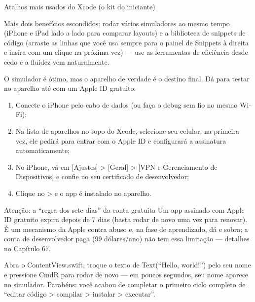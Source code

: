 \begin{center}\small\color{gray}Atalhos mais usados do Xcode (o kit do iniciante)\end{center}

Mais dois benefícios escondidos: rodar vários simuladores ao mesmo tempo (iPhone e iPad lado a lado para comparar layouts) e a biblioteca de snippets de código (arraste as linhas que você usa sempre para o painel de Snippets à direita e insira com um clique na próxima vez) — use as ferramentas de eficiência desde cedo e a fluidez vem naturalmente.


O simulador é ótimo, mas o aparelho de verdade é o destino final. Dá para testar no aparelho até com um Apple ID gratuito:

\begin{enumerate}
  \item Conecte o iPhone pelo cabo de dados (ou faça o debug sem fio no mesmo Wi-Fi);
  \item Na lista de aparelhos no topo do Xcode, selecione seu celular; na primeira vez, ele pedirá para entrar com o Apple ID e configurará a assinatura automaticamente;
  \item No iPhone, vá em [Ajustes] > [Geral] > [VPN e Gerenciamento de Dispositivos] e confie no seu certificado de desenvolvedor;
  \item Clique no > e o app é instalado no aparelho.
\end{enumerate}

\begin{tcbwarn}{Atenção: a “regra dos sete dias” da conta gratuita}
Um app assinado com Apple ID gratuito expira depois de 7 dias (basta rodar de novo uma vez para renovar). É um mecanismo da Apple contra abuso e, na fase de aprendizado, dá e sobra; a conta de desenvolvedor paga (99 dólares/ano) não tem essa limitação — detalhes no Capítulo 67.

\end{tcbwarn}



Abra o ContentView.swift, troque o texto de Text(“Hello, world!”) pelo seu nome e pressione CmdR para rodar de novo — em poucos segundos, seu nome aparece no simulador. Parabéns: você acabou de completar o primeiro ciclo completo de “editar código > compilar > instalar > executar”.


